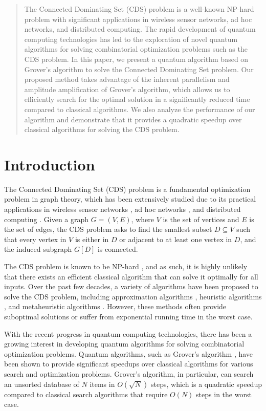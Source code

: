 \begin{abstract}
The Connected Dominating Set (CDS) problem is a well-known NP-hard problem with significant applications in wireless sensor networks, ad hoc networks, and distributed computing. The rapid development of quantum computing technologies has led to the exploration of novel quantum algorithms for solving combinatorial optimization problems such as the CDS problem. In this paper, we present a quantum algorithm based on Grover's algorithm to solve the Connected Dominating Set problem. Our proposed method takes advantage of the inherent parallelism and amplitude amplification of Grover's algorithm, which allows us to efficiently search for the optimal solution in a significantly reduced time compared to classical algorithms. We also analyze the performance of our algorithm and demonstrate that it provides a quadratic speedup over classical algorithms for solving the CDS problem.
\end{abstract}

\section{Introduction}

The Connected Dominating Set (CDS) problem is a fundamental optimization problem in graph theory, which has been extensively studied due to its practical applications in wireless sensor networks \cite{sensor_networks}, ad hoc networks \cite{adhoc_networks}, and distributed computing \cite{distributed_computing}. Given a graph $G=(V,E)$, where $V$ is the set of vertices and $E$ is the set of edges, the CDS problem asks to find the smallest subset $D \subseteq V$ such that every vertex in $V$ is either in $D$ or adjacent to at least one vertex in $D$, and the induced subgraph $G[D]$ is connected.

The CDS problem is known to be NP-hard \cite{NP_hard}, and as such, it is highly unlikely that there exists an efficient classical algorithm that can solve it optimally for all inputs. Over the past few decades, a variety of algorithms have been proposed to solve the CDS problem, including approximation algorithms \cite{approximation_algorithms}, heuristic algorithms \cite{heuristic_algorithms}, and metaheuristic algorithms \cite{metaheuristic_algorithms}. However, these methods often provide suboptimal solutions or suffer from exponential running time in the worst case.

With the recent progress in quantum computing technologies, there has been a growing interest in developing quantum algorithms for solving combinatorial optimization problems. Quantum algorithms, such as Grover's algorithm \cite{grover1996}, have been shown to provide significant speedups over classical algorithms for various search and optimization problems. Grover's algorithm, in particular, can search an unsorted database of $N$ items in $O(\sqrt{N})$ steps, which is a quadratic speedup compared to classical search algorithms that require $O(N)$ steps in the worst case.

